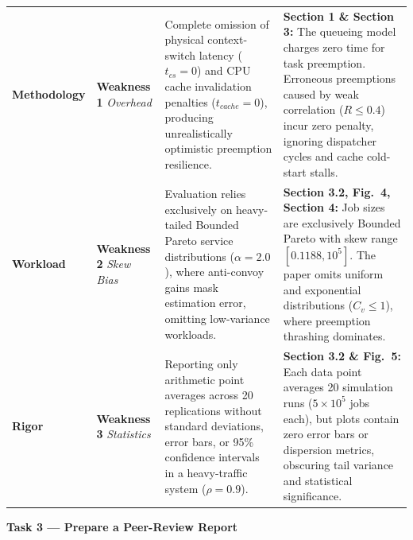 \documentclass[11pt]{article}
\begin{document}
\begin{center}
\begin{tabular}{@{}p{2.2cm} p{2.0cm} p{5.6cm} p{5.5cm}@{}}
    \textbf{Methodology} & 
    \textbf{Weakness 1} \newline \textit{Overhead} & 
    Complete omission of physical context-switch latency ($t_{cs}=0$) and CPU cache invalidation penalties ($t_{cache}=0$), producing unrealistically optimistic preemption resilience. & 
    \textbf{Section 1 \& Section 3:} The queueing model charges zero time for task preemption. Erroneous preemptions caused by weak correlation ($R \le 0.4$) incur zero penalty, ignoring dispatcher cycles and cache cold-start stalls. \\
    \addlinespace[0.2em]

    \textbf{Workload} & 
    \textbf{Weakness 2} \newline \textit{Skew Bias} & 
    Evaluation relies exclusively on heavy-tailed Bounded Pareto service distributions ($\alpha=2.0$), where anti-convoy gains mask estimation error, omitting low-variance workloads. & 
    \textbf{Section 3.2, Fig.~4, Section 4:} Job sizes are exclusively Bounded Pareto with skew range $[0.1188, 10^5]$. The paper omits uniform and exponential distributions ($C_v \le 1$), where preemption thrashing dominates. \\
    \addlinespace[0.2em]

    \textbf{Rigor} & 
    \textbf{Weakness 3} \newline \textit{Statistics} & 
    Reporting only arithmetic point averages across 20 replications without standard deviations, error bars, or 95\% confidence intervals in a heavy-traffic system ($\rho=0.9$). & 
    \textbf{Section 3.2 \& Fig.~5:} Each data point averages 20 simulation runs ($5 \times 10^5$ jobs each), but plots contain zero error bars or dispersion metrics, obscuring tail variance and statistical significance. \\
    \bottomrule
\end{tabular}
\vspace{0.3em}
\label{tab:strengths_weaknesses}
\end{center}

\newpage
{\centering\fontsize{13.5}{16.5}\selectfont\textbf{Task 3 --- Prepare a Peer-Review Report}\par}
\vspace{0.3em}
\end{document}
